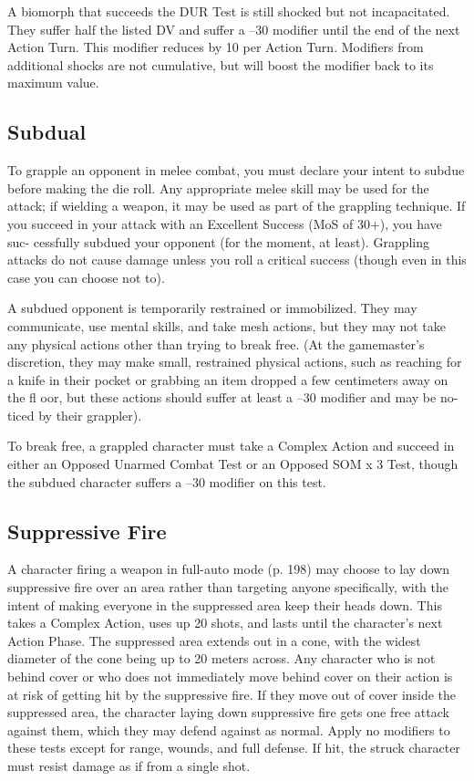 A biomorph that succeeds the DUR Test is still 
shocked but not incapacitated. They suffer half the 
listed DV and suffer a –30 modifier until the end of 
the next Action Turn. This modifier reduces by 10 per 
Action Turn. Modifiers from additional shocks are 
not cumulative, but will boost the modifier back to 
its maximum value.

\subsection{Subdual}

To grapple an opponent in melee combat, you must 
declare your intent to subdue before making the die 
roll. Any appropriate melee skill may be used for the 
attack; if wielding a weapon, it may be used as part of 
the grappling technique. If you succeed in your attack 
with an Excellent Success (MoS of 30+), you have suc-
cessfully subdued your opponent (for the moment, at 
least). Grappling attacks do not cause damage unless 
you roll a critical success (though even in this case you 
can choose not to).

A subdued opponent is temporarily restrained or 
immobilized. They may communicate, use mental 
skills, and take mesh actions, but they may not take 
any physical actions other than trying to break free. 
(At the gamemaster's discretion, they may make small, 
restrained physical actions, such as reaching for a 
knife in their pocket or grabbing an item dropped a 
few centimeters away on the fl oor, but these actions 
should suffer at least a –30 modifier and may be no-
ticed by their grappler).

To break free, a grappled character must take a 
Complex Action and succeed in either an Opposed 
Unarmed Combat Test or an Opposed SOM x 3 Test, 
though the subdued character suffers a –30 modifier 
on this test.

\subsection{Suppressive Fire}

A character firing a weapon in full-auto mode (p. 198) 
may choose to lay down suppressive fire over an area 
rather than targeting anyone specifically, with the 
intent of making everyone in the suppressed area keep 
their heads down. This takes a Complex Action, uses 
up 20 shots, and lasts until the character's next Action 
Phase. The suppressed area extends out in a cone, with 
the widest diameter of the cone being up to 20 meters 
across. Any character who is not behind cover or who 
does not immediately move behind cover on their 
action is at risk of getting hit by the suppressive fire. If 
they move out of cover inside the suppressed area, the 
character laying down suppressive fire gets one free 
attack against them, which they may defend against 
as normal. Apply no modifiers to these tests except 
for range, wounds, and full defense. If hit, the struck 
character must resist damage as if from a single shot.


